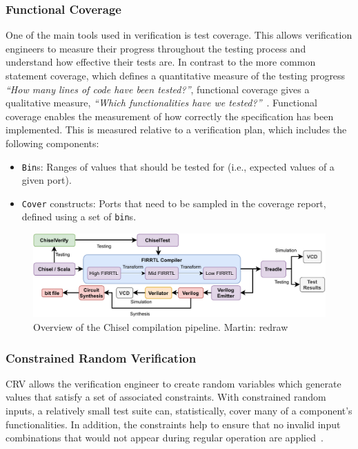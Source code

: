 \documentclass[conference]{IEEEtran}
\newcommand{\martin}[1]{{\color{blue} Martin: #1}}
\begin{document}
\subsubsection{Functional Coverage}
One of the main tools used in verification is test coverage. 
This allows verification engineers to measure their progress throughout the testing process and understand how effective their tests are. 
In contrast to the more common statement coverage, which defines a quantitative measure of the testing progress \textit{``How many lines of code have been tested?''}, functional coverage gives a qualitative measure, \textit{``Which functionalities have we tested?''}~\cite{spear2008systemverilog}.
Functional coverage enables the measurement of how correctly the specification has been implemented. 
This is measured relative to a verification plan, which includes the following components:

\begin{itemize}
  \item \texttt{Bin}s: Ranges of values that should be tested for (i.e., expected values of a given port).
  \item \texttt{Cover} constructs: Ports that need to be sampled in the coverage report, defined using a set of \texttt{bin}s.
\end{itemize}

\begin{figure}
  \centering
    \includegraphics[width=0.8\linewidth]{Chisel_FIRRTL_VERILOG.pdf}
    \caption{Overview of the Chisel compilation pipeline. \martin{redraw}}
\label{fig:chisel-pipe}
\end{figure}

\subsubsection{Constrained Random Verification}
CRV allows the verification engineer to create random variables which generate values that satisfy a set of associated constraints.
With constrained random inputs, a relatively small test suite can, statistically, cover many of a component's functionalities. 
In addition, the constraints help to ensure that no invalid input combinations that would not appear during regular operation are applied~\cite{MehtaCRV2018}.
\end{document}
